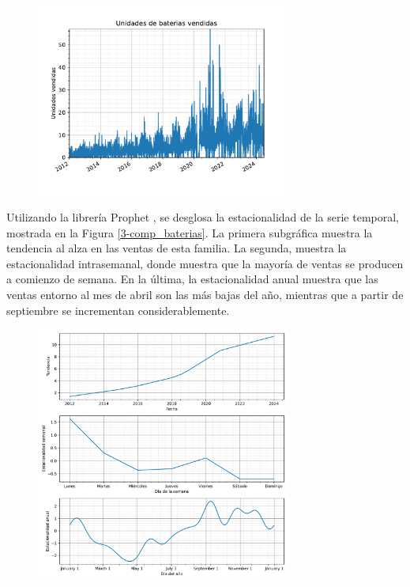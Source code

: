 \begin{figure}[H]
	{\includegraphics[width=0.75\textwidth]{imagenes/grafica_baterias.pdf}}
\end{figure}

Utilizando la librería Prophet \cite{prophet}, se desglosa la estacionalidad de la serie temporal, mostrada en la Figura \ref*{3-comp_baterias}. La primera subgráfica muestra la tendencia al alza en las ventas de esta familia. La segunda, muestra la estacionalidad intrasemanal, donde muestra que la mayoría de ventas se producen a comienzo de semana. En la última, la estacionalidad anual muestra que las ventas entorno al mes de abril son las más bajas del año, mientras que a partir de septiembre se incrementan considerablemente.

\begin{figure}[H]
	{\includegraphics[width=0.75\textwidth]{imagenes/comps_baterias.pdf}}
\end{figure}


